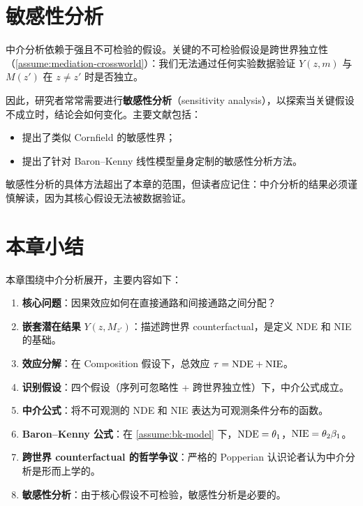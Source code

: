 \section{敏感性分析}

中介分析依赖于强且不可检验的假设。关键的不可检验假设是跨世界独立性（\cref{assume:mediation-crossworld}）：我们无法通过任何实验数据验证 $Y(z, m)$ 与 $M(z')$ 在 $z \neq z'$ 时是否独立。

因此，研究者常常需要进行\textbf{敏感性分析}（sensitivity analysis），以探索当关键假设不成立时，结论会如何变化。主要文献包括：

\begin{itemize}
  \item {} 提出了类似 Cornfield 的敏感性界；
  \item {} 提出了针对 Baron--Kenny 线性模型量身定制的敏感性分析方法。
\end{itemize}

敏感性分析的具体方法超出了本章的范围，但读者应记住：中介分析的结果必须谨慎解读，因为其核心假设无法被数据验证。

\section{本章小结}

本章围绕中介分析展开，主要内容如下：

\begin{enumerate}
  \item \textbf{核心问题}：因果效应如何在直接通路和间接通路之间分配？
  \item \textbf{嵌套潜在结果} $Y(z, M_{z'})$：描述跨世界 counterfactual，是定义 NDE 和 NIE 的基础。
  \item \textbf{效应分解}：在 Composition 假设下，总效应 $\tau = \mathrm{NDE} + \mathrm{NIE}$。
  \item \textbf{识别假设}：四个假设（序列可忽略性 + 跨世界独立性）下，中介公式成立。
  \item \textbf{中介公式}：将不可观测的 NDE 和 NIE 表达为可观测条件分布的函数。
  \item \textbf{Baron--Kenny 公式}：在 \cref{assume:bk-model} 下，$\mathrm{NDE} = \theta_1$，$\mathrm{NIE} = \theta_2 \beta_1$。
  \item \textbf{跨世界 counterfactual 的哲学争议}：严格的 Popperian 认识论者认为中介分析是形而上学的。
  \item \textbf{敏感性分析}：由于核心假设不可检验，敏感性分析是必要的。
\end{enumerate}

